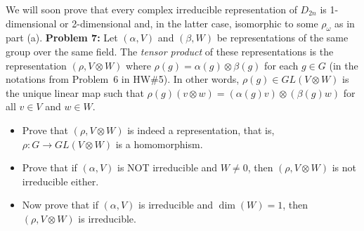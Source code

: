 \documentclass[11pt]{amsart}
\begin{document}
We will soon prove that every complex irreducible representation of $D_{2n}$ is 1-dimensional or 2-dimensional and, in the latter case,
isomorphic to some $\rho_{\omega}$ as in part (a).
\skv
{\bf Problem 7:} Let $(\alpha,V)$ and $(\beta,W)$ be representations of the same group over the same field. The {\it tensor product} of these representations is the representation $(\rho, V\otimes W)$ where $\rho(g)=\alpha(g)\otimes \beta(g)$ for each $g\in G$ (in the notations
from Problem~6 in HW\#5). In other words, $\rho(g)\in GL(V\otimes W)$ is the unique linear map such that $\rho(g)(v\otimes w)=
(\alpha(g)v)\otimes (\beta(g)w)$ for all $v\in V$ and $w\in W$.
\begin{itemize}
\item[(a)] Prove that $(\rho, V\otimes W)$ is indeed a representation, that is, $\rho: G\to GL(V\otimes W)$ is a homomorphism.
\item[(b)] Prove that if $(\alpha,V)$ is NOT irreducible and $W\neq 0$, then $(\rho,V\otimes W)$ is not irreducible either.
\item[(c)] Now prove that if $(\alpha,V)$ is irreducible and $\dim(W)=1$, then $(\rho,V\otimes W)$ is irreducible.
\end{itemize}
\skv
\end{document}
